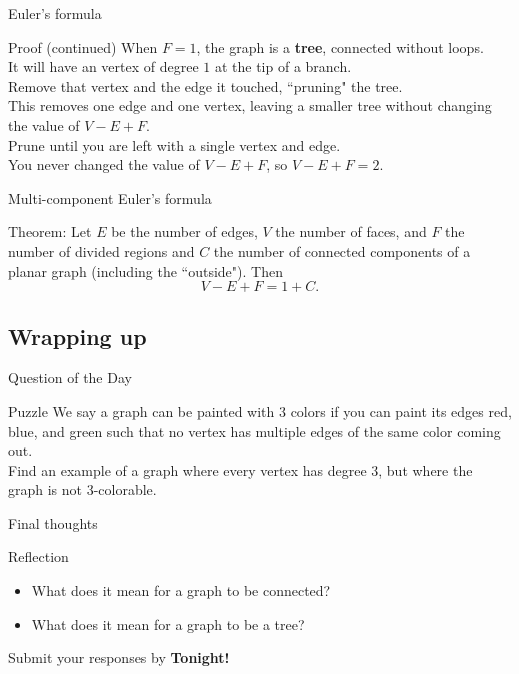 \documentclass{beamer}
\begin{document}
\begin{frame}{Euler's formula}
\pause
  \begin{block}{Proof (continued)}
\pause
    When $F=1$, the graph is a \textbf{tree}, connected without loops.\\
\pause
    It will have an vertex of degree $1$ at the tip of a branch.\\
\pause
    Remove that vertex and the edge it touched, ``pruning" the tree.\\
\pause
    This removes one edge and one vertex, leaving a smaller tree without changing the value of $V-E+F$.\\
\pause
    Prune until you are left with a single vertex and edge.\\
\pause
    You never changed the value of $V-E+F$, so $V-E+F=2$.
  \end{block}
\end{frame}

\begin{frame}{Multi-component Euler's formula}
\pause
  \begin{block}{Theorem:}
    Let $E$ be the number of edges, $V$ the number of faces, and $F$ the number of divided regions and $C$ the number of connected components of a planar graph (including the ``outside").  Then
  $$V-E+F = 1+C.$$
  \end{block}
\end{frame}

\subsection{Wrapping up}

\begin{frame}{Question of the Day}
\pause
  \begin{block}{Puzzle}
    We say a graph can be painted with $3$ colors if you can paint its edges red, blue, and green such that no vertex has multiple edges of the same color coming out.\\
    Find an example of a graph where every vertex has degree $3$, but where the graph is not $3$-colorable.
  \end{block}
\end{frame}

\begin{frame}{Final thoughts}
  \begin{block}{Reflection}
    \begin{itemize}
\pause
      \item What does it mean for a graph to be connected?
\pause
      \item What does it mean for a graph to be a tree?
    \end{itemize}
  \end{block}
\begin{center}
Submit your responses by \textbf{Tonight!}
\end{center}
\end{frame}
\end{document}
